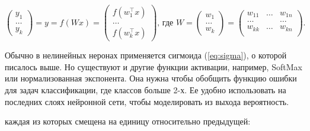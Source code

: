 \begin{equation*}
\begin{pmatrix}
   y_1 \\
   \ldots \\
   y_k
\end{pmatrix} = y = f(Wx) =
\begin{pmatrix}
   f(w_1^\top x)\\
   \ldots \\
   f(w_k^\top x)
\end{pmatrix}\text{, где } W =
\begin{pmatrix}
   w_1 \\
   \ldots \\
   w_k
\end{pmatrix} =
\begin{pmatrix}
   w_{11} & \ldots & w_{1n}\\
   \ldots &  & \ldots\\
   w_{kk} & \ldots & w_{kn}\\
\end{pmatrix}.
\end{equation*}



Обычно в нелинейных неронах применяется сигмоида (\ref{eq:sigma}), о которой писалось выше. Но существуют и
другие функции активации, например, SoftMax или нормализованная экспонента. Она нужна чтобы обобщить функцию
ошибки для задач классификации, где классов больше 2-х. Ее удобно использовать на последних слоях нейронной
сети, чтобы моделировать из выхода вероятность.

каждая из которых смещена на единицу относительно предыдущей:

